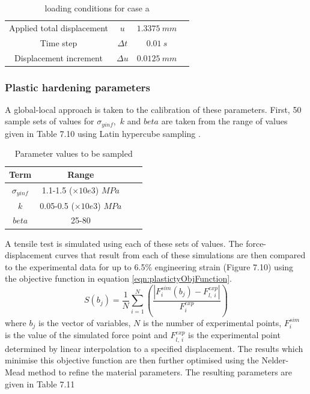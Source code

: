\documentclass[sn-mathphys,Numbered,draft]{sn-jnl}%
\begin{document}
\begin{table}[htb]
	\centering
		\begin{tabular}{cccc} \hline
		    Applied total displacement & $u$ & $1.3375\ mm$ \\
		    Time step & $\Delta t$ & $0.01\ s$ \\
			Displacement increment  & $\Delta u$ & $0.0125\ mm$   \\
			\hline
		\end{tabular}
	\caption{loading conditions for case a}
	\label{tab:material_properties}
\end{table}

\subsubsection{Plastic hardening parameters}

A global-local approach is taken to the calibration of these parameters. First, 50 sample sets of values for $\sigma_{yinf}$,\ $k$ and $beta$ are taken from the range of values given in Table 7.10 using Latin hypercube sampling \cite{loh_latin_1996}. 

\begin{table}[htb]
	\centering
		\begin{tabular}{cccc} \hline
			Term  & Range  \\ \hline 
             $\sigma_{yinf}$ & 1.1-1.5 ($\times10e3$) $MPa$ \\
			$k$ & 0.05-0.5 ($\times10e3$) $MPa$  \\
   		$beta$ & 25-80 &  \\
			\hline
		\end{tabular}
	\caption{Parameter values to be sampled}
	\label{tab:material_properties}
\end{table}

A tensile test is simulated using each of these sets of values. The force-displacement curves that result from each of these simulations are then compared to the experimental data for up to 6.5\% engineering strain (Figure 7.10) using the objective function in equation \ref{eqn:plastictyObjFunction}. 
\begin{equation}
\label{eqn:plastictyObjFunction}
S(b_j)=\frac{1}{N} \sum_{i=1}^N\left(\frac{|F^{sim}_i(b_j)-F^{exp}_{l,\ i}|}{F^{exp}_i}\right)
\end{equation}
where $b_j$ is the vector of variables, $N$ is the number of experimental points, $F^{sim}_i$ is the value of the simulated force point and $F^{exp}_{l,\ i}$ is the experimental point determined by linear interpolation to a specified displacement.
The results which minimise this objective function are then further optimised using the Nelder-Mead method \cite{luersen_globalized_2004} to refine the material parameters. 
 The resulting parameters are given in Table 7.11
 
\end{document}

